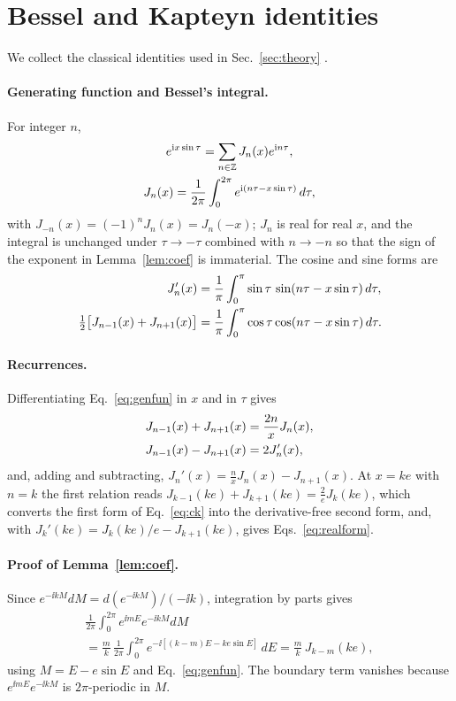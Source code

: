 \section{Bessel and Kapteyn identities}
\label{app:bessel}

We collect the classical identities used in Sec.~\ref{sec:theory}
\cite{Watson1944,Dutka1995}.

\paragraph*{Generating function and Bessel's integral.}
For integer $n$,
\begin{gather}
e^{\mathrm{i} x\sin\tau}=\sum_{n\in\mathbb Z}J_n(x)e^{\mathrm{i} n\tau},\notag\\
J_n(x)=\frac1{2\pi}\int_0^{2\pi}e^{\mathrm{i}(n\tau-x\sin\tau)}\,d\tau,
\label{eq:genfun}
\end{gather}
with $J_{-n}(x)=(-1)^nJ_n(x)=J_n(-x)$; $J_n$ is real for real $x$, and the
integral is unchanged under $\tau\to-\tau$ combined with $n\to-n$ so that the sign
of the exponent in Lemma~\ref{lem:coef} is immaterial. The cosine and sine forms
are
\begin{align}
J_n'(x)&=\frac1\pi\int_0^\pi\sin\tau\,\sin(n\tau-x\sin\tau)\,d\tau,\notag\\
\tfrac12\big[J_{n-1}(x)+J_{n+1}(x)\big]&=\frac1\pi\int_0^\pi\cos\tau\cos(n\tau-x\sin\tau)\,d\tau .
\label{eq:cossin}
\end{align}

\paragraph*{Recurrences.}
Differentiating Eq.~\eqref{eq:genfun} in $x$ and in $\tau$ gives
\begin{align}
J_{n-1}(x)+J_{n+1}(x)&=\frac{2n}{x}J_n(x),\notag\\
J_{n-1}(x)-J_{n+1}(x)&=2J_n'(x),
\label{eq:recur}
\end{align}
and, adding and subtracting,
$J_n'(x)=\frac nxJ_n(x)-J_{n+1}(x)$. At $x=ke$ with $n=k$ the first relation
reads $J_{k-1}(ke)+J_{k+1}(ke)=\tfrac2eJ_k(ke)$, which converts the first form of
Eq.~\eqref{eq:ck} into the derivative-free second form, and, with
$J_k'(ke)=J_k(ke)/e-J_{k+1}(ke)$, gives Eqs.~\eqref{eq:realform}.

\paragraph*{Proof of Lemma~\ref{lem:coef}.}
Since $e^{-\ii kM}dM=d(e^{-\ii kM})/(-\ii k)$, integration by parts gives
\begin{multline}
\frac1{2\pi}\int_0^{2\pi}e^{\ii mE}e^{-\ii kM}dM\\
=\frac{m}{k}\,\frac1{2\pi}\int_0^{2\pi}e^{-\ii[(k-m)E-ke\sin E]}\,dE
=\frac mk\,J_{k-m}(ke),
\end{multline}
using $M=E-e\sin E$ and Eq.~\eqref{eq:genfun}. The boundary term vanishes
because $e^{\ii mE}e^{-\ii kM}$ is $2\pi$-periodic in $M$.

